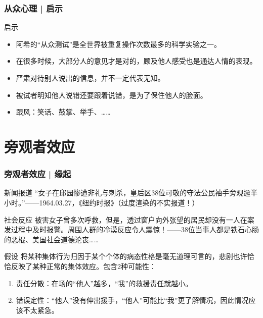 \begin{frame}
  \frametitle{从众心理 | 启示}
  \begin{block}{启示}
    \begin{itemize}
      \item 阿希的“从众测试”是全世界被重复操作次数最多的科学实验之一。
      \item 在很多时候，大部分人的意见才是对的，顾及他人感受也是通达人情的表现。
      \item 严肃对待别人说出的信息，并不一定代表无知。
      \item 被试者明知他人说错还要跟着说错，是为了保住他人的脸面。
      \item 跟风：笑话、鼓掌、举手、……
    \end{itemize}
  \end{block}
\end{frame}

\section{旁观者效应}
\begin{frame}
  \frametitle{旁观者效应 | 缘起}
  \begin{block}{新闻报道}
    “女子在邱园惨遭非礼与刺杀，皇后区38位可敬的守法公民袖手旁观逾半小时。”——1964.03.27，《纽约时报》（过度渲染的不实报道！）
  \end{block}
  \pause
  \begin{block}{社会反应}
    被害女子曾多次呼救，但是，透过窗户向外张望的居民却没有一人在案发过程中及时报警。周围人群的冷漠反应令人震惊！——38位当事人都是铁石心肠的恶棍、美国社会道德沦丧……
  \end{block}
  \pause
  \begin{block}{假设}
    将某种集体行为归因于某个个体的病态性格是毫无道理可言的，悲剧也许恰恰反映了某种正常的集体效应。包含2种可能性：
    \begin{enumerate}
      \item 责任分散：在场的“他人”越多，“我”的救援责任就越小。
      \item 错误定性：“他人”没有伸出援手，“他人”可能比“我”更了解情况，因此情况应该不太紧急。
    \end{enumerate}
  \end{block}
\end{frame}

